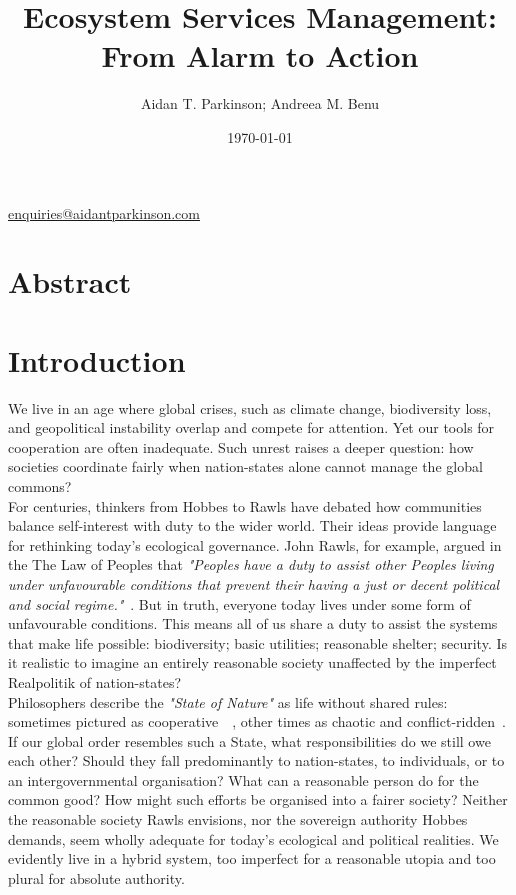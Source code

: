 \documentclass[11pt, oneside]{article}   	%
\title{Ecosystem Services Management: From Alarm to Action}
\author{Aidan T. Parkinson; Andreea M. Benu}
\date{\today}							%
\begin{document}
\maketitle
\begin{center}
\href{mailto:enquiries@aidantparkinson.com}{enquiries@aidantparkinson.com}
\end{center}

\section{Abstract}


\section{Introduction}

We live in an age where global crises, such as climate change, biodiversity loss, and geopolitical instability overlap and compete for attention.
Yet our tools for cooperation are often inadequate.
Such unrest raises a deeper question: how societies coordinate fairly when nation-states alone cannot manage the global commons?\\

For centuries, thinkers from Hobbes to Rawls have debated how communities balance self-interest with duty to the wider world.
Their ideas provide language for rethinking today's ecological governance.
John Rawls, for example, argued in the The Law of Peoples that \emph{"Peoples have a duty to assist other Peoples living under unfavourable conditions that prevent their having a just or decent political and social regime."}~\cite{jr2}.
But in truth, everyone today lives under some form of unfavourable conditions.
This means all of us share a duty to assist the systems that make life possible: biodiversity; basic utilities; reasonable shelter; security.
Is it realistic to imagine an entirely reasonable society unaffected by the imperfect Realpolitik of nation-states?\\

Philosophers describe the \emph{"State of Nature"} as life without shared rules: sometimes pictured as cooperative~\cite{jl1}~\cite{rn1}, other times as chaotic and conflict-ridden~\cite{th1}.
If our global order resembles such a State, what responsibilities do we still owe each other?
Should they fall predominantly to nation-states, to individuals, or to an intergovernmental organisation?
What can a reasonable person do for the common good?
How might such efforts be organised into a fairer society?
Neither the reasonable society Rawls envisions, nor the sovereign authority Hobbes demands, seem wholly adequate for today's ecological and political realities.
We evidently live in a hybrid system, too imperfect for a reasonable utopia and too plural for absolute authority.\\
\end{document}
